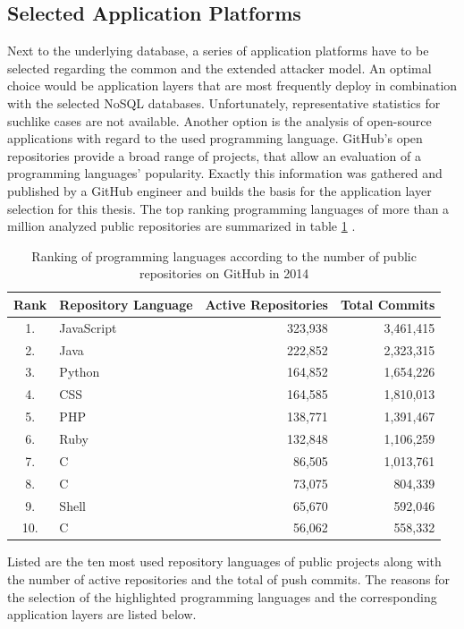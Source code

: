 \subsection{Selected Application Platforms}
Next to the underlying database, a series of application platforms have to be selected regarding the common and the extended attacker model. An optimal choice would be application layers that are most frequently deploy in combination with the selected NoSQL databases. Unfortunately, representative statistics for suchlike cases are not available. Another option is the analysis of open-source applications with regard to the used programming language. GitHub's open repositories provide a broad range of projects, that allow an evaluation of a programming languages' popularity. Exactly this information was gathered and published by a GitHub engineer and builds the basis for the application layer selection for this thesis. The top ranking programming languages of more than a million analyzed public repositories are summarized in table \ref{tab:language_ranking} \cite{Zapponi2014}.

\begin{table}[h]
 \sffamily 
 \centering
 \begin{tabular}{clrr}
  \textbf{Rank} & \textbf{Repository Language} & \textbf{Active Repositories} & \textbf{Total Commits} \\ \hline
  \rowcolor{light-gray} 1. &  JavaScript     & 323,938 & 3,461,415 \\
  2. &  Java   & 222,852 & 2,323,315 \\
  \rowcolor{light-gray} 3. &  Python  & 164,852 & 1,654,226 \\
  4. &  CSS       & 164,585 & 1,810,013 \\
  \rowcolor{light-gray}5. &  PHP      & 138,771 & 1,391,467 \\
  \rowcolor{light-gray}6. &  Ruby  & 132,848 & 1,106,259 \\
   7. &  C\scriptsize\raisebox{.5ex}{++} & 86,505 & 1,013,761 \\
  8. &  C & 73,075 & 804,339 \\
  9. &  Shell   & 65,670 & 592,046 \\
  10. &  C\scriptsize\raisebox{.5ex}{\#} & 56,062 & 558,332 \\
  \bottomrule
 \end{tabular}
 \caption{Ranking of programming languages according to the number of public repositories on GitHub in 2014}
 \label{tab:language_ranking}
\end{table}
Listed are the ten most used repository languages of public projects along with the number of active repositories and the total of push commits. The reasons for the selection of the highlighted programming languages and the corresponding application layers are listed below.

